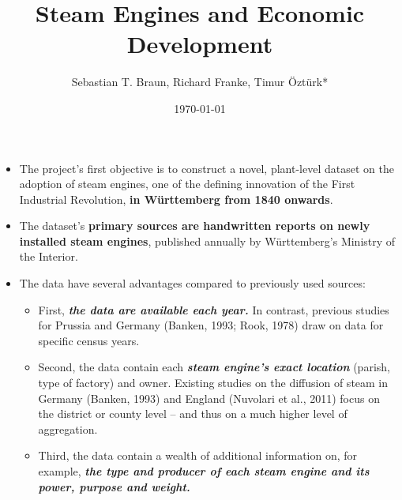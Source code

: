 \documentclass[25pt,a1paper, portrait, colspace = 0.5cm, blockverticalspace = 5mm]{tikzposter}
\title{Steam Engines and Economic Development}
\author{Sebastian T. Braun, Richard Franke, Timur Öztürk*}
\date{\today}
\institute{University of Bayreuth}
\begin{document}
\maketitle[titlegraphictotitledistance=-1.5cm,titletoblockverticalspace=0.5cm]

{

\begin{itemize}
\item The project’s first objective is to construct a novel, plant-level dataset on the adoption of steam engines, one of the defining innovation of the First Industrial Revolution, \textbf{in Württemberg from 1840 onwards}. 
\item The dataset’s \textbf{primary sources are handwritten reports on newly installed steam engines}, published annually by Württemberg’s Ministry of the Interior.
\item The data have several advantages compared to previously used sources:
\begin{itemize}
\item First, \textbf{\emph{the data are available each year.}} In contrast, previous studies for Prussia and Germany (Banken, 1993; Rook, 1978) draw on data for specific census years.
\item Second, the data contain each\textbf{ \emph{steam engine’s exact location}} (parish, type of factory) and owner. Existing studies on the diffusion of steam in Germany (Banken, 1993) and England (Nuvolari et al., 2011) focus on the district or county level – and thus on a much higher level of aggregation. 
\item Third, the data contain a wealth of additional information on, for example, \textbf{\emph{the type and producer of each steam engine and its power, purpose and weight.}}
\end{itemize}
\end{itemize}
}


\end{document}
